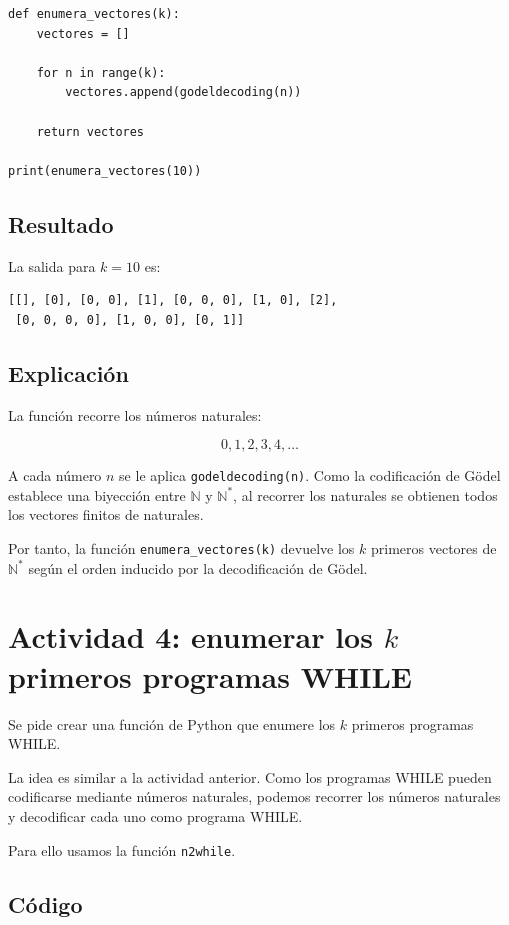 \documentclass[10pt]{article}
\begin{document}
\begin{verbatim}
def enumera_vectores(k):
    vectores = []

    for n in range(k):
        vectores.append(godeldecoding(n))

    return vectores

print(enumera_vectores(10))
\end{verbatim}

\subsection{Resultado}

La salida para $k=10$ es:

\begin{verbatim}
[[], [0], [0, 0], [1], [0, 0, 0], [1, 0], [2],
 [0, 0, 0, 0], [1, 0, 0], [0, 1]]
\end{verbatim}

\subsection{Explicación}

La función recorre los números naturales:

\[
    0,1,2,3,4,\dots
\]

A cada número $n$ se le aplica \texttt{godeldecoding(n)}. Como la codificación de Gödel establece una biyección entre $\mathbb{N}$ y $\mathbb{N}^*$, al recorrer los naturales se obtienen todos los vectores finitos de naturales.

Por tanto, la función \texttt{enumera\_vectores(k)} devuelve los $k$ primeros vectores de $\mathbb{N}^*$ según el orden inducido por la decodificación de Gödel.

\section{Actividad 4: enumerar los $k$ primeros programas WHILE}

Se pide crear una función de Python que enumere los $k$ primeros programas WHILE.

La idea es similar a la actividad anterior. Como los programas WHILE pueden codificarse mediante números naturales, podemos recorrer los números naturales y decodificar cada uno como programa WHILE.

Para ello usamos la función \texttt{n2while}.

\subsection{Código}
\end{document}
